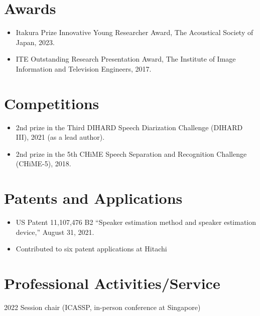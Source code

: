 \documentclass[letterpaper,11pt]{article}
\newcommand{\resumeItem}[1]{
  \item\small{
    {#1 \vspace{-2pt}}
  }
}
\newcommand{\resumeItemListStart}{\begin{itemize}}
\newcommand{\resumeItemListEnd}{\end{itemize}\vspace{-5pt}}
\begin{document}
\section{Awards}
  \resumeItemListStart
    \resumeItem{Itakura Prize Innovative Young Researcher Award, The Acoustical Society of Japan, 2023.}
    \resumeItem{ITE Outstanding Research Presentation Award, The Institute of Image Information and Television Engineers, 2017.}
  \resumeItemListEnd

\section{Competitions}
  \resumeItemListStart
    \resumeItem{2nd prize in the Third DIHARD Speech Diarization Challenge (DIHARD III), 2021  (as a lead author).}
    \resumeItem{2nd prize in the 5th CHiME Speech Separation and Recognition Challenge (CHiME-5), 2018.}
  \resumeItemListEnd

\section{Patents and Applications}
  \resumeItemListStart
    \resumeItem{US Patent 11,107,476 B2 ``Speaker estimation method and speaker estimation device,'' August 31, 2021.}
    \resumeItem{Contributed to six patent applications at Hitachi}
  \resumeItemListEnd
  
\section{Professional Activities/Service}
2022 Session chair (ICASSP, in-person conference at Singapore)
    
\end{document}
